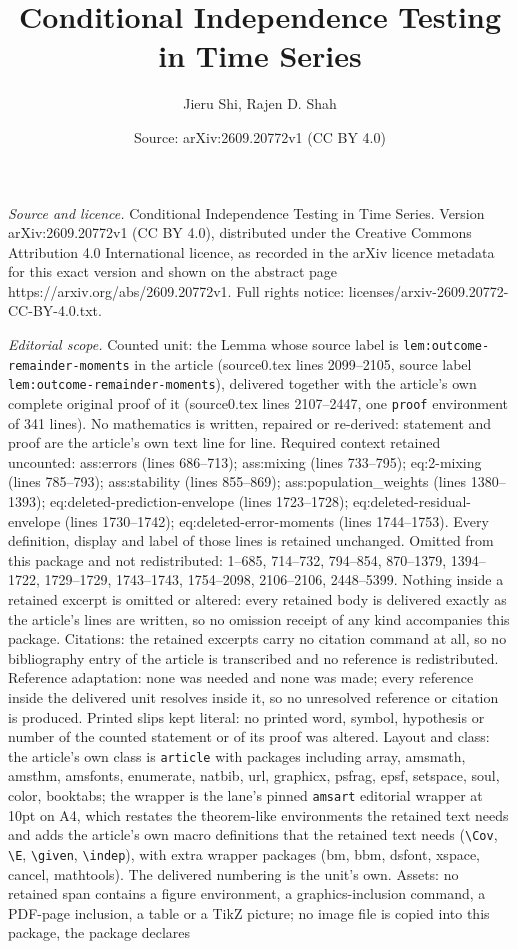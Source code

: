 \documentclass[10pt,a4paper]{amsart}
\title[Conditional Independence Testing in Time Series]{Conditional Independence Testing in Time Series}
\author{Jieru Shi, Rajen D. Shah}
\date{Source: arXiv:2609.20772v1 (CC BY 4.0)}
\begin{document}
\maketitle

\noindent\emph{Source and licence.} Conditional Independence Testing in Time Series. Version arXiv:2609.20772v1 (CC BY 4.0), distributed under the Creative Commons Attribution 4.0 International licence, as recorded in the arXiv licence metadata for this exact version and shown on the abstract page https://arxiv.org/abs/2609.20772v1. Full rights notice: licenses/arxiv-2609.20772-CC-BY-4.0.txt.\par\smallskip

\noindent\textit{Editorial scope.} Counted unit: the Lemma whose source label is \texttt{lem:outcome-remainder-moments} in the article (source0.tex lines 2099--2105, source label \texttt{lem:outcome-remainder-moments}), delivered together with the article's own complete original proof of it (source0.tex lines 2107--2447, one \texttt{proof} environment of 341 lines). No mathematics is written, repaired or re-derived: statement and proof are the article's own text line for line. Required context retained uncounted: ass:errors (lines 686--713); ass:mixing (lines 733--795); eq:2-mixing (lines 785--793); ass:stability (lines 855--869); ass:population\_weights (lines 1380--1393); eq:deleted-prediction-envelope (lines 1723--1728); eq:deleted-residual-envelope (lines 1730--1742); eq:deleted-error-moments (lines 1744--1753). Every definition, display and label of those lines is retained unchanged. Omitted from this package and not redistributed: 1--685, 714--732, 794--854, 870--1379, 1394--1722, 1729--1729, 1743--1743, 1754--2098, 2106--2106, 2448--5399. Nothing inside a retained excerpt is omitted or altered: every retained body is delivered exactly as the article's lines are written, so no omission receipt of any kind accompanies this package. Citations: the retained excerpts carry no citation command at all, so no bibliography entry of the article is transcribed and no reference is redistributed. Reference adaptation: none was needed and none was made; every reference inside the delivered unit resolves inside it, so no unresolved reference or citation is produced. Printed slips kept literal: no printed word, symbol, hypothesis or number of the counted statement or of its proof was altered. Layout and class: the article's own class is \texttt{article} with packages including array, amsmath, amsthm, amsfonts, enumerate, natbib, url, graphicx, psfrag, epsf, setspace, soul, color, booktabs; the wrapper is the lane's pinned \texttt{amsart} editorial wrapper at 10pt on A4, which restates the theorem-like environments the retained text needs and adds the article's own macro definitions that the retained text needs (\texttt{\textbackslash Cov}, \texttt{\textbackslash E}, \texttt{\textbackslash given}, \texttt{\textbackslash indep}), with extra wrapper packages (bm, bbm, dsfont, xspace, cancel, mathtools). The delivered numbering is the unit's own. Assets: no retained span contains a figure environment, a graphics-inclusion command, a PDF-page inclusion, a table or a TikZ picture; no image file is copied into this package, the package declares 
\end{document}
